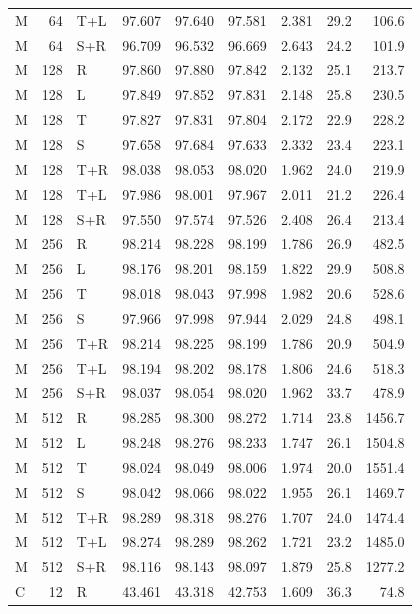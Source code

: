 \begin{longtable}{@{}lrlrrrrrr@{}}
M & 64 & T+L & 97.607 & 97.640 & 97.581 & 2.381 & 29.2 & 106.6 \\
M & 64 & S+R & 96.709 & 96.532 & 96.669 & 2.643 & 24.2 & 101.9 \\
\addlinespace
M & 128 & R & 97.860 & 97.880 & 97.842 & 2.132 & 25.1 & 213.7 \\
M & 128 & L & 97.849 & 97.852 & 97.831 & 2.148 & 25.8 & 230.5 \\
M & 128 & T & 97.827 & 97.831 & 97.804 & 2.172 & 22.9 & 228.2 \\
M & 128 & S & 97.658 & 97.684 & 97.633 & 2.332 & 23.4 & 223.1 \\
M & 128 & T+R & 98.038 & 98.053 & 98.020 & 1.962 & 24.0 & 219.9 \\
M & 128 & T+L & 97.986 & 98.001 & 97.967 & 2.011 & 21.2 & 226.4 \\
M & 128 & S+R & 97.550 & 97.574 & 97.526 & 2.408 & 26.4 & 213.4 \\
\addlinespace
M & 256 & R & 98.214 & 98.228 & 98.199 & 1.786 & 26.9 & 482.5 \\
M & 256 & L & 98.176 & 98.201 & 98.159 & 1.822 & 29.9 & 508.8 \\
M & 256 & T & 98.018 & 98.043 & 97.998 & 1.982 & 20.6 & 528.6 \\
M & 256 & S & 97.966 & 97.998 & 97.944 & 2.029 & 24.8 & 498.1 \\
M & 256 & T+R & 98.214 & 98.225 & 98.199 & 1.786 & 20.9 & 504.9 \\
M & 256 & T+L & 98.194 & 98.202 & 98.178 & 1.806 & 24.6 & 518.3 \\
M & 256 & S+R & 98.037 & 98.054 & 98.020 & 1.962 & 33.7 & 478.9 \\
\addlinespace
M & 512 & R & 98.285 & 98.300 & 98.272 & 1.714 & 23.8 & 1456.7 \\
M & 512 & L & 98.248 & 98.276 & 98.233 & 1.747 & 26.1 & 1504.8 \\
M & 512 & T & 98.024 & 98.049 & 98.006 & 1.974 & 20.0 & 1551.4 \\
M & 512 & S & 98.042 & 98.066 & 98.022 & 1.955 & 26.1 & 1469.7 \\
M & 512 & T+R & 98.289 & 98.318 & 98.276 & 1.707 & 24.0 & 1474.4 \\
M & 512 & T+L & 98.274 & 98.289 & 98.262 & 1.721 & 23.2 & 1485.0 \\
M & 512 & S+R & 98.116 & 98.143 & 98.097 & 1.879 & 25.8 & 1277.2 \\
\addlinespace
C & 12 & R & 43.461 & 43.318 & 42.753 & 1.609 & 36.3 & 74.8 \\

\end{longtable}
